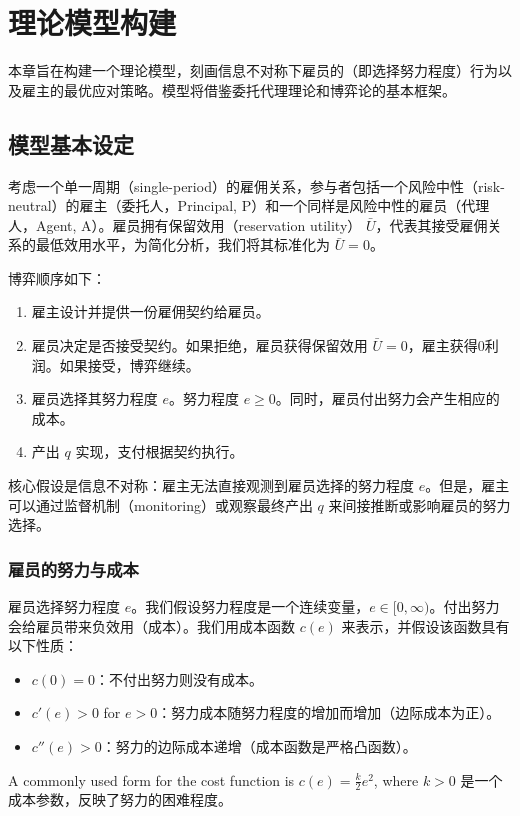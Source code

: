 \chapter{理论模型构建}
\label{chap:model}

本章旨在构建一个理论模型，刻画信息不对称下雇员的（即选择努力程度）行为以及雇主的最优应对策略。模型将借鉴委托代理理论和博弈论的基本框架。

\section{模型基本设定}
\label{sec:model_setup}

考虑一个单一周期（single-period）的雇佣关系，参与者包括一个风险中性（risk-neutral）的雇主（委托人，Principal, P）和一个同样是风险中性的雇员（代理人，Agent, A）。雇员拥有保留效用（reservation utility） $\bar{U}$，代表其接受雇佣关系的最低效用水平，为简化分析，我们将其标准化为 $\bar{U} = 0$。

博弈顺序如下：
\begin{enumerate}
    \item  雇主设计并提供一份雇佣契约给雇员。
    \item  雇员决定是否接受契约。如果拒绝，雇员获得保留效用 $\bar{U}=0$，雇主获得0利润。如果接受，博弈继续。
    \item  雇员选择其努力程度 $e$。努力程度 $e \ge 0$。同时，雇员付出努力会产生相应的成本。
    \item  产出 $q$ 实现，支付根据契约执行。
\end{enumerate}

核心假设是信息不对称：雇主无法直接观测到雇员选择的努力程度 $e$。但是，雇主可以通过监督机制（monitoring）或观察最终产出 $q$ 来间接推断或影响雇员的努力选择。

\subsection{雇员的努力与成本}

雇员选择努力程度 $e$。我们假设努力程度是一个连续变量，$e \in [0, \infty)$。付出努力会给雇员带来负效用（成本）。我们用成本函数 $c(e)$ 来表示，并假设该函数具有以下性质：
\begin{itemize}
    \item $c(0) = 0$：不付出努力则没有成本。
    \item $c'(e) > 0$ for $e > 0$：努力成本随努力程度的增加而增加（边际成本为正）。
    \item $c''(e) > 0$：努力的边际成本递增（成本函数是严格凸函数）。
\end{itemize}
A commonly used form for the cost function is $c(e) = \frac{k}{2}e^2$, where $k > 0$ 是一个成本参数，反映了努力的困难程度。

